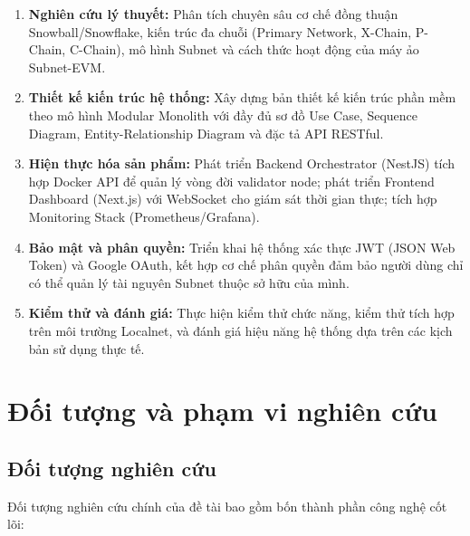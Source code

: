 \begin{enumerate}[label=(\roman*)]
    \item \textbf{Nghiên cứu lý thuyết:} Phân tích chuyên sâu cơ chế đồng thuận Snowball/Snowflake, kiến trúc đa chuỗi (Primary Network, X-Chain, P-Chain, C-Chain), mô hình Subnet và cách thức hoạt động của máy ảo Subnet-EVM.

    \item \textbf{Thiết kế kiến trúc hệ thống:} Xây dựng bản thiết kế kiến trúc phần mềm theo mô hình Modular Monolith với đầy đủ sơ đồ Use Case, Sequence Diagram, Entity-Relationship Diagram và đặc tả API RESTful.

    \item \textbf{Hiện thực hóa sản phẩm:} Phát triển Backend Orchestrator (NestJS) tích hợp Docker API để quản lý vòng đời validator node; phát triển Frontend Dashboard (Next.js) với WebSocket cho giám sát thời gian thực; tích hợp Monitoring Stack (Prometheus/Grafana).

    \item \textbf{Bảo mật và phân quyền:} Triển khai hệ thống xác thực JWT (JSON Web Token) và Google OAuth, kết hợp cơ chế phân quyền đảm bảo người dùng chỉ có thể quản lý tài nguyên Subnet thuộc sở hữu của mình.

    \item \textbf{Kiểm thử và đánh giá:} Thực hiện kiểm thử chức năng, kiểm thử tích hợp trên môi trường Localnet, và đánh giá hiệu năng hệ thống dựa trên các kịch bản sử dụng thực tế.
\end{enumerate}

\section{Đối tượng và phạm vi nghiên cứu}

\subsection{Đối tượng nghiên cứu}

Đối tượng nghiên cứu chính của đề tài bao gồm bốn thành phần công nghệ cốt lõi:

